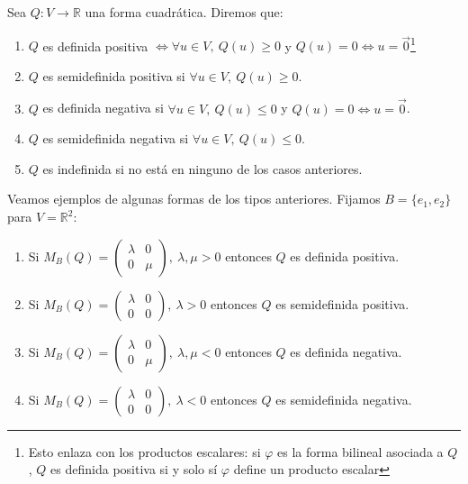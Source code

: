 \documentclass[14pt]{book}
\begin{document}
\begin{dfn}
	Sea $Q: V \to \mathbb{R}$ una forma cuadrática. Diremos que:
	\begin{enumerate}
		\item $Q$ es definida positiva $\iff \forall u \in V,\ Q(u) \geq 0$ y $Q(u) = 0 \iff u = \vec{0}$\footnote{Esto enlaza con los productos escalares: si $\varphi$ es la forma bilineal asociada a $Q$, $Q$ es definida positiva si y solo sí $\varphi$ define un producto escalar}
		\item $Q$ es semidefinida positiva si $\forall u \in V,\ Q(u) \geq 0$.
		\item $Q$ es definida negativa si $\forall u \in V,\ Q(u) \leq 0$ y $Q(u) = 0 \iff u = \vec{0}$.
		\item $Q$ es semidefinida negativa si $\forall u \in V,\ Q(u) \leq 0$.
		\item $Q$ es indefinida si no está en ninguno de los casos anteriores.
	\end{enumerate}
\end{dfn}

\begin{ej}
	Veamos ejemplos de algunas formas de los tipos anteriores. Fijamos $B = \{e_1, e_2\}$ para $V = \mathbb{R}^2$:
	\begin{enumerate}
		\item Si $M_B(Q) = \left(\begin{array}{cc}
		\lambda & 0 \\ 0 & \mu
		\end{array}\right),\ \lambda, \mu > 0$ entonces $Q$ es definida positiva.
		\item Si $M_B(Q) = \left(\begin{array}{cc}
		\lambda & 0 \\ 0 & 0
		\end{array}\right),\ \lambda > 0$ entonces $Q$ es semidefinida positiva.
		\item Si $M_B(Q) = \left(\begin{array}{cc}
		\lambda & 0 \\ 0 & \mu
		\end{array}\right),\ \lambda, \mu < 0$ entonces $Q$ es definida negativa.
		\item Si $M_B(Q) = \left(\begin{array}{cc}
		\lambda & 0 \\ 0 & 0
		\end{array}\right),\ \lambda < 0$ entonces $Q$ es semidefinida negativa.
	\end{enumerate}
\end{ej}
\end{document}
